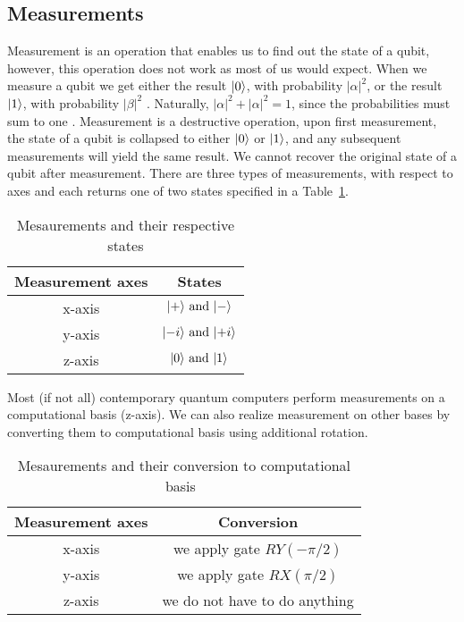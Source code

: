 \subsection{Measurements}
Measurement is an operation that enables us to find out the state of a qubit, however, this operation does not work as most of us would expect. When we measure a qubit we get either the result $\lvert0\rangle$, with probability $\lvert \alpha \rvert^2$, or the result $\lvert1\rangle$, with probability $\lvert \beta \rvert^2$ \cite{qc}. Naturally, $\lvert \alpha \rvert^2 + \lvert \alpha \rvert^2 = 1$, since the probabilities must sum to one \cite{qc}.  Measurement is a destructive operation, upon first measurement, the state of a qubit is collapsed to either $\lvert0\rangle$ or $\lvert1\rangle$, and any subsequent measurements will yield the same result. We cannot recover the original state of a qubit after measurement. There are three types of measurements, with respect to axes and each returns one of two states specified in a Table~\ref{tab:measurements-states}.
\begin{table}[H]
  \centering
  \begin{tabular}{|c|c|} 
      \hline
      \multicolumn{1}{|c|}{\textbf{Measurement axes}} & \textbf{States}\\
      \hline
      x-axis & $\lvert+\rangle \text{ and }\lvert-\rangle$\\ 
      \hline
      y-axis & $\lvert-i\rangle \text{ and }\lvert+i\rangle$\\ 
      \hline
      z-axis & $\lvert0\rangle \text{ and }\lvert1\rangle$\\ 
      \hline
  \end{tabular}
  \caption{Mesaurements and their respective states}
  \label{tab:measurements-states}
\end{table}
Most (if not all) contemporary quantum computers perform measurements on a computational basis (z-axis). We can also realize measurement on other bases by converting them to computational basis using additional rotation.

\begin{table}[H]
  \centering
  \begin{tabular}{|c|c|} 
      \hline
      \multicolumn{1}{|c|}{\textbf{Measurement axes}} & \textbf{Conversion}\\
      \hline
      x-axis & we apply gate $RY(-\pi/2)$ \\ 
      \hline
      y-axis & we apply gate $RX(\pi/2)$ \\ 
      \hline
      z-axis & we do not have to do anything \\ 
      \hline
  \end{tabular}
  \caption{Mesaurements and their conversion to computational basis~\cite{blog}}
  \label{tab:measurements-conversion}
\end{table}
\\

